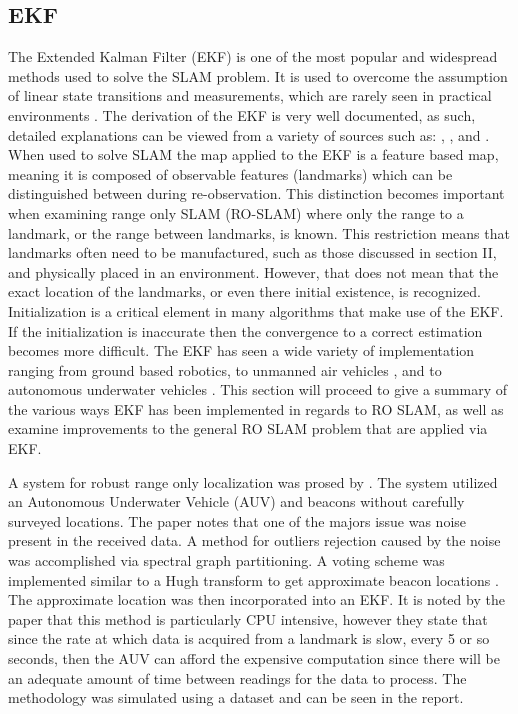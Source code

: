 \documentclass[conference]{IEEEtran}
\begin{document}
\subsection{EKF}
The Extended Kalman Filter (EKF) is one of the most popular and widespread methods used to solve the SLAM problem. It is used to overcome the assumption of linear state transitions and measurements, which are rarely seen in practical environments \cite{Thrun2002}. The derivation of the EKF is very well documented, as such, detailed explanations can be viewed from a variety of sources such as: \cite{Thrun2002}, \cite{Ribeiro2004}, and \cite{Haykin2001}. When used to solve SLAM the map applied to the EKF is a feature based map, meaning it is composed of observable features (landmarks) which can be distinguished between during re-observation.\cite{Thrun2002} This distinction becomes important when examining range only SLAM (RO-SLAM) where only the range to a landmark, or the range between landmarks, is known. This restriction means that landmarks often need to be manufactured, such as those discussed in section II, and physically placed in an environment. However, that does not mean that the exact location of the landmarks, or even there initial existence, is recognized. Initialization is a critical element in many algorithms that make use of the EKF. If the initialization is inaccurate then the convergence to a correct estimation becomes more difficult. The EKF has seen a wide variety of implementation ranging from ground based robotics\cite{Djugash2008}, to unmanned air vehicles \cite{Fabresse2016}, and to autonomous underwater vehicles \cite{Olson2006}. This section will proceed to give a summary of the various ways EKF has been implemented in regards to RO SLAM, as well as examine improvements to the general RO SLAM problem that are applied via EKF.

A system for robust range only localization was prosed by \cite{Olson2006}. The system utilized an Autonomous Underwater Vehicle (AUV) and beacons without carefully surveyed locations. The paper notes that one of the majors issue was noise present in the received data. A method for outliers rejection caused by the noise was accomplished via spectral graph partitioning. A voting scheme was implemented similar to a Hugh transform to get approximate beacon locations \cite{Hough1959}. The approximate location was then incorporated into an EKF. It is noted by the paper that this method is particularly CPU intensive, however they state that since the rate at which data is acquired from a landmark is slow, every 5 or so seconds, then the AUV can afford the expensive computation since there will be an adequate amount of time between readings for the data to process. The methodology was simulated using a dataset and can be seen in the report.
\end{document}
